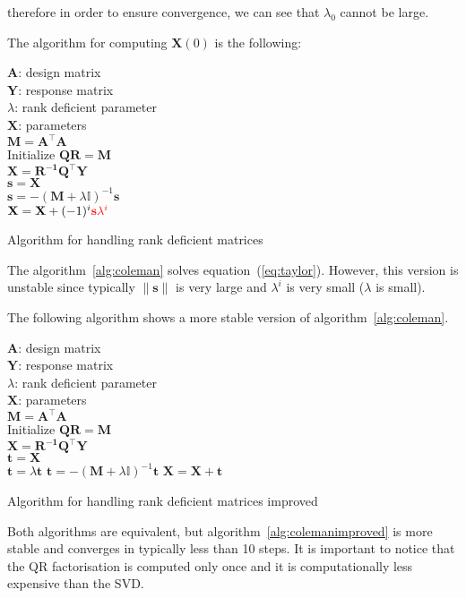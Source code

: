 \noindent therefore in order to ensure convergence, we can see that $\lambda_0$ cannot be large. 

The algorithm for computing $\mathbf{X}(0)$ is the following:

\begin{algorithm}[H]
\begin{algorithmic}[1]
\REQUIRE $\,$ \\
$\mathbf{A}$: design matrix \\
$\mathbf{Y}$: response matrix \\
$\lambda$: rank deficient parameter \\
\ENSURE  $\,$ \\
$\mathbf{X}$: parameters \\
\STATE $\mathbf{M}=\mathbf{A^\top A}$ \\
\STATE Initialize $\mathbf{Q R}=\mathbf{M}$ \\
\STATE $\mathbf{X} = \mathbf{R^{-1}Q^\top Y}$ \\
\STATE $\mathbf{s} = \mathbf{X}$ \\
	\STATE $\mathbf{s} =
        -(\mathbf{M}+\lambda\mathbb{I})^{-1}\mathbf{s}$\\
	\STATE $\mathbf{X}=\mathbf{X} + (-1)^i {\color{red}\mathbf{s}
        \lambda^i}$
\ENDFOR
\end{algorithmic}
\caption{Algorithm for handling rank deficient matrices}
\label{alg:coleman}
\end{algorithm}

The algorithm~\ref{alg:coleman} solves equation~(\ref{eq:taylor}). However, this
version is unstable since typically $\|\mathbf{s}\|$ is very large and
$\lambda^i$ is very small ($\lambda$ is small).

The following algorithm shows a more stable version of
algorithm~\ref{alg:coleman}.


\begin{algorithm}[H]
\begin{algorithmic}[1]
\REQUIRE $\,$ \\
$\mathbf{A}$: design matrix \\
$\mathbf{Y}$: response matrix \\
$\lambda$: rank deficient parameter \\
\ENSURE  $\,$ \\
$\mathbf{X}$: parameters \\
\STATE $\mathbf{M}=\mathbf{A^\top A}$ \\
\STATE Initialize $\mathbf{Q R}=\mathbf{M}$ \\
\STATE $\mathbf{X} = \mathbf{R^{-1}Q^\top Y}$ \\
\STATE $\mathbf{t} = \mathbf{X}$ \\
        \STATE $\mathbf{t} =\lambda \mathbf{t}$  
        \STATE $\mathbf{t} =  -(\mathbf{M}+\lambda\mathbb{I})^{-1}\mathbf{t}$
	\STATE $\mathbf{X}=\mathbf{X} + \mathbf{t}$
\ENDFOR
\end{algorithmic}
\caption{Algorithm for handling rank deficient matrices improved}
\label{alg:colemanimproved}
\end{algorithm}

Both algorithms are equivalent, but algorithm~\ref{alg:colemanimproved} is more
stable and converges in typically less than 10 steps.
It is important to notice that the QR factorisation is computed only once and it
is computationally less expensive than the SVD.


